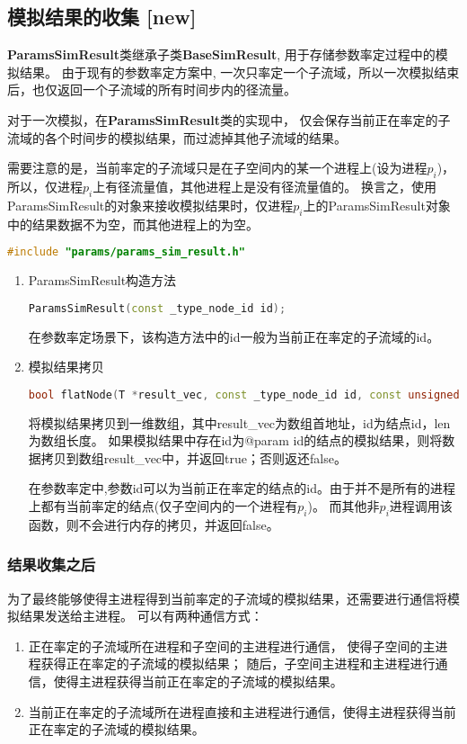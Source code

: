 \subsection{模拟结果的收集 {\color{cyan} [\textbf{new}] }}
\textbf{ParamsSimResult}类继承子类\textbf{BaseSimResult}, 用于存储参数率定过程中的模拟结果。
由于现有的参数率定方案中, 一次只率定一个子流域，所以一次模拟结束后，也仅返回一个子流域的所有时间步内的径流量。

对于一次模拟，在\textbf{ParamsSimResult}类的实现中，
仅会保存当前正在率定的子流域的各个时间步的模拟结果，而过滤掉其他子流域的结果。

需要注意的是，当前率定的子流域只是在子空间内的某一个进程上(设为进程$p_i$)，
所以，仅进程$p_i$上有径流量值，其他进程上是没有径流量值的。
换言之，使用ParamsSimResult的对象来接收模拟结果时，仅进程$p_i$上的ParamsSimResult对象中的结果数据不为空，而其他进程上的为空。

\begin{lstlisting}[language=c]
#include "params/params_sim_result.h"
\end{lstlisting}

\begin{enumerate}
  \item ParamsSimResult构造方法
\begin{lstlisting}[language=c++]
  ParamsSimResult(const _type_node_id id);
\end{lstlisting}
  在参数率定场景下，该构造方法中的id一般为当前正在率定的子流域的id。

  \item 模拟结果拷贝
\begin{lstlisting}[language=c++]
   bool flatNode(T *result_vec, const _type_node_id id, const unsigned long len)
\end{lstlisting}
   将模拟结果拷贝到一维数组，其中result\_vec为数组首地址，id为结点id，len为数组长度。
   如果模拟结果中存在id为@param id的结点的模拟结果，则将数据拷贝到数组result\_vec中，并返回true；否则返还false。

   在参数率定中,参数id可以为当前正在率定的结点的id。由于并不是所有的进程上都有当前率定的结点(仅子空间内的一个进程有$p_i$)。
   而其他非$p_i$进程调用该函数，则不会进行内存的拷贝，并返回false。
\end{enumerate}

\subsubsection*{结果收集之后}
为了最终能够使得主进程得到当前率定的子流域的模拟结果，还需要进行通信将模拟结果发送给主进程。
可以有两种通信方式：
\begin{enumerate}
 \item 正在率定的子流域所在进程和子空间的主进程进行通信，
使得子空间的主进程获得正在率定的子流域的模拟结果；
随后，子空间主进程和主进程进行通信，使得主进程获得当前正在率定的子流域的模拟结果。
 \item 当前正在率定的子流域所在进程直接和主进程进行通信，使得主进程获得当前正在率定的子流域的模拟结果。
\end{enumerate}